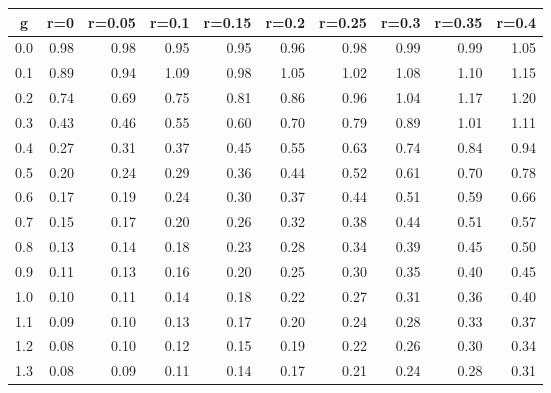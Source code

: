%
\begin{table}[!tbp]
 \begin{center}
 \begin{tabular}{rrrrrrrrrr}\hline\hline
\multicolumn{1}{c}{g}&\multicolumn{1}{c}{r=0}&\multicolumn{1}{c}{r=0.05}&\multicolumn{1}{c}{r=0.1}&\multicolumn{1}{c}{r=0.15}&\multicolumn{1}{c}{r=0.2}&\multicolumn{1}{c}{r=0.25}&\multicolumn{1}{c}{r=0.3}&\multicolumn{1}{c}{r=0.35}&\multicolumn{1}{c}{r=0.4}\tabularnewline
\hline
0.0&0.98&0.98&0.95&0.95&0.96&0.98&0.99&0.99&1.05\tabularnewline
0.1&0.89&0.94&1.09&0.98&1.05&1.02&1.08&1.10&1.15\tabularnewline
0.2&0.74&0.69&0.75&0.81&0.86&0.96&1.04&1.17&1.20\tabularnewline
0.3&0.43&0.46&0.55&0.60&0.70&0.79&0.89&1.01&1.11\tabularnewline
0.4&0.27&0.31&0.37&0.45&0.55&0.63&0.74&0.84&0.94\tabularnewline
0.5&0.20&0.24&0.29&0.36&0.44&0.52&0.61&0.70&0.78\tabularnewline
0.6&0.17&0.19&0.24&0.30&0.37&0.44&0.51&0.59&0.66\tabularnewline
0.7&0.15&0.17&0.20&0.26&0.32&0.38&0.44&0.51&0.57\tabularnewline
0.8&0.13&0.14&0.18&0.23&0.28&0.34&0.39&0.45&0.50\tabularnewline
0.9&0.11&0.13&0.16&0.20&0.25&0.30&0.35&0.40&0.45\tabularnewline
1.0&0.10&0.11&0.14&0.18&0.22&0.27&0.31&0.36&0.40\tabularnewline
1.1&0.09&0.10&0.13&0.17&0.20&0.24&0.28&0.33&0.37\tabularnewline
1.2&0.08&0.10&0.12&0.15&0.19&0.22&0.26&0.30&0.34\tabularnewline
1.3&0.08&0.09&0.11&0.14&0.17&0.21&0.24&0.28&0.31\tabularnewline
\hline
\end{tabular}

\end{center}

\end{table}

